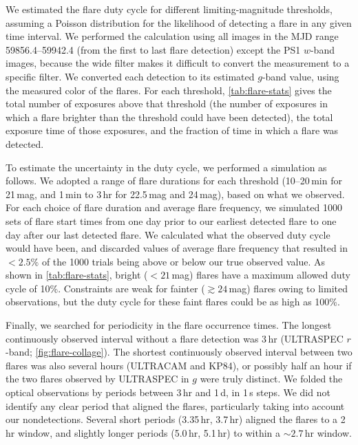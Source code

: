\documentclass{nature_plusfigure}
\begin{document}
\begin{methods}
We estimated the flare duty cycle for different limiting-magnitude thresholds, assuming a Poisson distribution for the likelihood of detecting a flare in any given time interval.
We performed the calculation using all images in the MJD range 59856.4--59942.4 (from the first to last flare detection) except the PS1 $w$-band images, because the wide filter makes it difficult to convert the measurement to a specific filter.
We converted each detection to its estimated $g$-band value, using the measured color of the flares.
For each threshold, \ref{tab:flare-stats} gives the total number of exposures above that threshold (the number of exposures in which a flare brighter than the threshold could have been detected), the total exposure time of those exposures, and the fraction of time in which a flare was detected. 

To estimate the uncertainty in the duty cycle, we performed a simulation as follows. We adopted a range of flare durations for each threshold (10--20\,min for 21\,mag, and 1\,min to 3\,hr for 22.5\,mag and 24\,mag), based on what we observed. For each choice of flare duration and average flare frequency, we simulated 1000 sets of flare start times from one day prior to our earliest detected flare to one day after our last detected flare. We calculated what the observed duty cycle would have been, and discarded values of average flare frequency that resulted in $<2.5\%$ of the 1000 trials being above or below our true observed value.  As shown in \ref{tab:flare-stats}, bright ($<21$\,mag) flares have a maximum allowed duty cycle of 10\%. Constraints are weak for fainter ($\gtrsim24$\,mag) flares owing to limited observations, but the duty cycle for these faint flares could be as high as 100\%.  

Finally, we searched for periodicity in the flare occurrence times. The longest continuously observed interval without a flare detection was 3\,hr (ULTRASPEC $r$-band; \ref{fig:flare-collage}). The shortest continuously observed interval between two flares was also several hours (ULTRACAM and KP84), or possibly half an hour if the two flares observed by ULTRASPEC in $g$ were truly distinct. We folded the optical observations by periods between 3\,hr and 1\,d, in 1\,s steps.
We did not identify any clear period that aligned the flares, particularly taking into account our nondetections.
Several short periods (3.35\,hr, 3.7\,hr) aligned the flares to a 2\,hr window, and slightly longer periods (5.0\,hr, 5.1\,hr) to within a $\sim2.7$\,hr window.


\end{methods}
\end{document}
